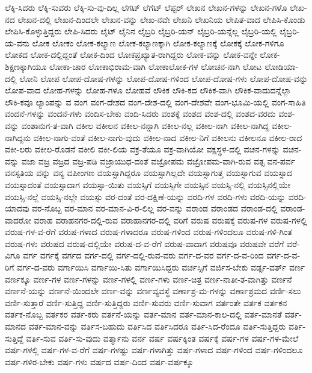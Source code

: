 {ಲೆಕ್ಕಿ-ಸಿದರು
ಲೆಕ್ಕಿ-ಸುವರು
ಲೆಕ್ಕಿ-ಸು-ವು-ದಿಲ್ಲ
ಲೆಗಟ್
ಲೆಗೆಟ್
ಲೆಪ್ಟರ್
ಲೇಖನ
ಲೇಖನ-ಗಳನ್ನು
ಲೇಖನ-ಗಳೊ
ಲೇಖ-ನದ
ಲೇಖನ-ದಲ್ಲಿ
ಲೇಖನ-ದಿಂದಲೇ
ಲೇಖನ-ವನ್ನು
ಲೇಖ-ನವೇ
ಲೇಖನಿ
ಲೇಖನಿಯ
ಲೇಪಿತ-ವಾದ
ಲೇಪಿಸಿ-ಕೊಂಡು
ಲೇಪಿಸಿ-ಕೊಳ್ಳುತ್ತಿದ್ದರು
ಲೇಪಿ-ಸಿದರು
ಲೈಟ್
ಲೈನಿನ
ಲೈಬ್ರರಿ
ಲೈಬ್ರರಿ-ಯನ್
ಲೈಬ್ರರಿ-ಯನ್ನೆಲ್ಲ
ಲೈಬ್ರರಿ-ಯಲ್ಲಿ
ಲೈಬ್ರರಿ-ಯ-ವನು
ಲೋಕ
ಲೋಕಂ
ಲೋಕ-ಕಲ್ಯಾಣ
ಲೋಕ-ಕಲ್ಯಾಣಕ್ಕಾಗಿ
ಲೋಕ-ಕಲ್ಯಾಣಕ್ಕೆ
ಲೋಕಕ್ಕೆ
ಲೋಕ-ಗಳಿಗೂ
ಲೋಕದ
ಲೋಕ-ದಲ್ಲಿದ್ದಂತೆ
ಲೋಕ-ದಿಂದ
ಲೋಕಪ್ರಖ್ಯಾತ-ರಾಗಿದ್ದರು
ಲೋಕ-ವನ್ನು
ಲೋಕ-ವನ್ನೇ
ಲೋಕ-ಶಿಕ್ಷಣಕ್ಕಾಗಿಯೂ
ಲೋಕಾ-ಚಾರ
ಲೋಕಾಭಿರಾಮ-ವಾಗಿ
ಲೋಕಾಲೋಕ-ಗಳ
ಲೋಚನ-ನಾಗಿ
ಲೋಟ
ಲೋಡಿಯಾ-ದಲ್ಲಿ
ಲೋನಿ
ಲೋಪ
ಲೋಪ-ದೋಷ-ಗಳನ್ನು
ಲೋಪ-ದೋಷ-ಗಳಿಂದ
ಲೋಪ-ದೋಷ-ಗಳು
ಲೋಪ-ದೋಷ-ವನ್ನು
ಲೋಪ-ವಾದ
ಲೋಹ-ಗಳನ್ನು
ಲೋಹ-ಗಳೂ
ಲೋಹವೆ
ಲೌಕಿಕ
ಲೌಕಿ-ಕದ
ಲೌಕಿಕ-ವಾಗಿ
ಲೌಕಿಕ-ವಾದುದನ್ನೆಲ್ಲಾ
ಲೌಕಿ-ಕವೂ
ಲ್ಯಾಂಪನ್ನು
ವ
ವಂಗ
ವಂಗ-ದೇಶದ
ವಂಗ-ದೇಶ-ದಲ್ಲಿ
ವಂಗ-ದೇಶವೇ
ವಂಗ-ಭೂಮಿ-ಯಲ್ಲಿ
ವಂಗ-ಸಾಹಿತಿ
ವಂದನೆ-ಗಳನ್ನು
ವಂದನೆ-ಗಳು
ವಂದಿಸ-ಬೇಕು
ವಂದಿ-ಸಿದರು
ವಂಶಕ್ಕೆ
ವಂಶದ
ವಂಶ-ದಲ್ಲಿ
ವಂಶದ-ವರದು
ವಂಶ-ವನ್ನು
ವಂಶಾನುಗ-ತ-ವಾಗಿ
ವಕೀಲ
ವಕೀಲನ
ವಕೀಲ-ನನ್ನಾಗಿ
ವಕೀಲ-ನಲ್ಲ
ವಕೀಲ-ನಾಗಿ
ವಕೀಲ-ನಾಗಿದ್ದ
ವಕೀಲ-ನಾಗಿದ್ದನು
ವಕೀಲ-ನಾಗು-ವಂತೆ
ವಕೀಲ-ನಾಗು-ವುದು
ವಕೀಲ-ನಾದ
ವಕೀಲ-ನಿಗೆ
ವಕೀಲನು
ವಕೀಲನೂ
ವಕೀಲ-ರಾದ
ವಕೀ-ಲರು
ವಕೀಲ-ರೊಡನೆ
ವಕೀಲಿ
ವಕೀ-ಲಿಯ
ವಕ್ರ-ತೆಯೂ
ವಕ್ರ-ವಾಗಿಯೋ
ವಕ್ಷಸ್ಥಳ-ದಲ್ಲಿ
ವಚನ-ಗಳನ್ನು
ವಚನ-ವನ್ನು
ವಜಾ
ವಜ್ರ
ವಜ್ರದ
ವಜ್ರ-ಪಡಿ
ವಜ್ರಾಯುಧ-ದಂತೆ
ವಜ್ರೋಪಮ
ವಜ್ರೋಪಮ-ವಾಗಿ-ರುವ
ವತ್ಸ
ವನ-ಪರ್ವ
ವನಸ್ಪತಿಯ
ವನ್ನು
ವನ್ಯ
ವಪೀಂಗಣ
ವಯಸ್ಸಾಗಿದ್ದರೂ
ವಯಸ್ಸಾಗಿಲ್ಲದೇ
ವಯಸ್ಸಾಗುತ್ತ
ವಯಸ್ಸಾಗುವ
ವಯಸ್ಸಾದ
ವಯಸ್ಸಾದಂತೆ
ವಯಸ್ಸಾದಾಗ
ವಯಸ್ಸಾ-ಯಿತು
ವಯಸ್ಸಿಗೆ
ವಯಸ್ಸಿಗೇ
ವಯಸ್ಸಿನ
ವಯಸ್ಸಿ-ನಲ್ಲಿ
ವಯಸ್ಸಿನಲ್ಲಿಯೇ
ವಯಸ್ಸಿ-ನಲ್ಲೆ
ವಯಸ್ಸಿ-ನಲ್ಲೇ
ವಯಸ್ಸು
ವರ-ದಂತೆ
ವರ-ದಕ್ಷಿಣೆ-ಯನ್ನು
ವರದಿ-ಗಳ
ವರದಿ-ಗಳು
ವರದಿ-ಯನ್ನು
ವರದಿ-ಯಾದವು
ವರ-ನೊಬ್ಬ
ವರ-ಮಾನ
ವರ-ಮಾನ-ವಿ-ರ-ಲಿಲ್ಲ
ವರ-ವನ್ನು
ವರಾಂಡ
ವರಾಂಡದ
ವರಾಂಡ-ದಲ್ಲಿ
ವರಾಂಡ-ವಾದರೋ
ವರಾಹ
ವರಾಹನಗರ-ದಲ್ಲಿ-ರುವ
ವರಾಹಾನಗರ-ದಲ್ಲಿ
ವರಿಗೆ
ವರುಷ
ವರುಷಕ್ಕೆ
ವರುಷ-ಗಳ
ವರುಷ-ಗಳಲ್ಲಿ
ವರುಷ-ಗಳ-ವ-ರೆಗೆ
ವರುಷ-ಗಳಾದ
ವರುಷ-ಗಳಾದರೂ
ವರುಷ-ಗಳಿಂದ
ವರುಷ-ಗಳಿಂದಲೂ
ವರುಷ-ಗಳಿ-ಗಿಂತ
ವರುಷ-ಗಳು
ವರುಷದ
ವರುಷ-ದಲ್ಲಿಯೇ
ವರುಷ-ದ-ವ-ರೆಗೆ
ವರುಷ-ವಾದಾಗ
ವರುಷವೂ
ವರುಷವೇ
ವರೆಗೆ
ವರೆ-ವಿಗೂ
ವರ್ಗ
ವರ್ಗಕ್ಕೆ
ವರ್ಗದ
ವರ್ಗ-ದಲ್ಲಿ
ವರ್ಗ-ದಲ್ಲಿ-ರುವ-ವರು
ವರ್ಗ-ದ-ವರ
ವರ್ಗ-ದ-ವ-ರಿಂದ
ವರ್ಗ-ದ-ವ-ರಿಗೆ
ವರ್ಗ-ದ-ವರು
ವರ್ಗಾಯಿಸಿ
ವರ್ಗಾಯಿ-ಸಿತು
ವರ್ಗಾಯಿಸಿದ್ದರು
ವರ್ಚಸ್ಸಿಗೆ
ವರ್ಜಿಸ-ಬೇಕು
ವರ್ಡ್ಸ-ವರ್ತ್
ವರ್ಣ
ವರ್ಣಕ್ಕೂ
ವರ್ಣ-ಗಳ
ವರ್ಣ-ಗಳನ್ನು
ವರ್ಣ-ಗಳಲ್ಲಿ
ವರ್ಣ-ಗಳು
ವರ್ಣ-ಚಿತ್ರ
ವರ್ಣ-ನಾತೀ-ತ-ವಾಗಿತ್ತು
ವರ್ಣನೆ
ವರ್ಣನೆ-ಯನ್ನು
ವರ್ಣನೆ-ಯಿಂದಲೇ
ವರ್ಣ-ವನ್ನು
ವರ್ಣವ್ಯವಸ್ಥೆ
ವರ್ಣಾಶ್ರ-ಮ-ಗಳನ್ನು
ವರ್ಣಾಶ್ರಮದ
ವರ್ಣಿ-ಸಲು
ವರ್ಣಿ-ಸುತ್ತಾರೆ
ವರ್ಣಿ-ಸುತ್ತಿದ್ದ
ವರ್ಣಿ-ಸುತ್ತಿದ್ದರು
ವರ್ಣಿ-ಸುವರು
ವರ್ಣಿ-ಸುವಾಗ
ವರ್ತಂತೇ
ವರ್ತಕ
ವರ್ತಕನ
ವರ್ತಕ-ನೊಬ್ಬ
ವರ್ತಕರ
ವರ್ತ-ಕರು
ವರ್ತನೆ-ಯನ್ನು
ವರ್ತ-ಮಾನ
ವರ್ತ-ಮಾನ-ಕಾಲ-ದಲ್ಲಿ
ವರ್ತ-ಮಾನತೆ
ವರ್ತ-ಮಾನದ
ವರ್ತ-ಮಾನ-ವನ್ನು
ವರ್ತಿಸ-ಬಹುದು
ವರ್ತಿಸಿದ
ವರ್ತಿಸಿದರೂ
ವರ್ತಿ-ಸಿದ-ರೆಂದೂ
ವರ್ತಿ-ಸುತ್ತಿದ್ದರು
ವರ್ತಿ-ಸುತ್ತಿದ್ದೆ
ವರ್ತಿ-ಸುವ
ವರ್ತಿ-ಸು-ವುದು
ವರ್ತ್ಮಾನು
ವರ್ನ
ವರ್ಷ
ವರ್ಷಕ್ಕಿಂತ
ವರ್ಷಕ್ಕೆ
ವರ್ಷ-ಗಳ
ವರ್ಷ-ಗಳ-ಮೇಲೆ
ವರ್ಷ-ಗಳಲ್ಲಿ
ವರ್ಷ-ಗಳ-ವ-ರೆಗೆ
ವರ್ಷ-ಗಳಷ್ಟು
ವರ್ಷ-ಗಳಾಗಿತ್ತು
ವರ್ಷ-ಗಳಾದ
ವರ್ಷ-ಗಳಿಂದ
ವರ್ಷ-ಗಳಿಂದಲೂ
ವರ್ಷ-ಗಳಿರ-ಬೇಕು
ವರ್ಷ-ಗಳು
ವರ್ಷದ
ವರ್ಷ-ದಿಂದ
ವರ್ಷ-ವರ್ಷಕ್ಕೂ
}
